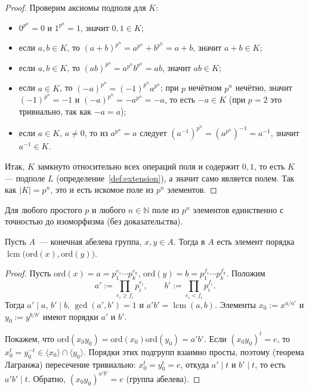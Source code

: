 \documentclass[12pt]{article}
\newcommand{\ord}{\text{ord}}
\begin{document}
\begin{proof}
    	Проверим аксиомы подполя для $K$:
    	\begin{itemize}
    		\item $0^{p^n}=0$ и $1^{p^n}=1$, значит $0,1 \in K$;
    		\item если $a,b\in K$, то $(a+b)^{p^n}=a^{p^n}+b^{p^n}=a+b$, значит $a+b\in K$;
    		\item если $a,b\in K$, то $(ab)^{p^n}=a^{p^n}b^{p^n}=ab$, значит $ab\in K$;
    		\item если $a\in K$, то $(-a)^{p^n} = (-1)^{p^n}a^{p^n}$; при $p$ нечётном $p^n$ нечётно, значит $(-1)^{p^n}=-1$ и $(-a)^{p^n}=-a^{p^n}=-a$, то есть $-a\in K$ (при $p=2$ это тривиально, так как $-a=a$);
    		\item если $a\in K$, $a\ne 0$, то из $a^{p^n}=a$ следует $(a^{-1})^{p^n} = (a^{p^n})^{-1} = a^{-1}$, значит $a^{-1}\in K$.
    	\end{itemize}
    	Итак, $K$ замкнуто относительно всех операций поля и содержит $0,1$, то есть $K$ --- подполе $L$ (определение~\ref{def:extension}), а значит само является полем. Так как $|K|=p^n$, это и есть искомое поле из $p^n$ элементов.
    \end{proof}
    
    \begin{statement}
    	Для любого простого $p$ и любого $n \in \mathbb{N}$ поле из $p^n$ элементов единственно с точностью до изоморфизма (без доказательства).
    \end{statement}

    \begin{lemma}\label{lem:lcm-order}
    	Пусть $A$~--- конечная абелева группа, $x, y \in A$. Тогда в $A$ есть элемент порядка $\operatorname{lcm}\bigl(\ord(x), \ord(y)\bigr)$.
    \end{lemma}
    \begin{proof}
    	Пусть $\ord(x) = a = p_1^{e_1} \cdots p_k^{e_k}$, $\ord(y) = b = p_1^{f_1} \cdots p_k^{f_k}$. Положим
    	\[
    		a' := \prod_{e_i \geqslant f_i} p_i^{e_i}, \qquad b' := \prod_{e_i < f_i} p_i^{f_i}.
    	\]
    	Тогда $a' \mid a$, $b' \mid b$, $\gcd(a', b') = 1$ и $a'b' = \operatorname{lcm}(a, b)$. Элементы $x_0 := x^{a/a'}$ и $y_0 := y^{b/b'}$ имеют порядки $a'$ и $b'$.

    	Покажем, что $\ord(x_0y_0) = \ord(x_0)\ord(y_0) = a'b'$. Если $(x_0y_0)^t = e$, то $x_0^t = y_0^{-t} \in \langle x_0 \rangle \cap \langle y_0 \rangle$. Порядки этих подгрупп взаимно просты, поэтому (теорема Лагранжа) пересечение тривиально: $x_0^t = y_0^t = e$, откуда $a' \mid t$ и $b' \mid t$, то есть $a'b' \mid t$. Обратно, $(x_0y_0)^{a'b'} = e$ (группа абелева).
    \end{proof}
\end{document}
